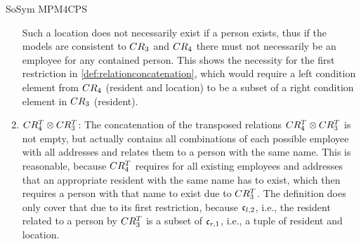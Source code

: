 \begin{copiedFrom}{SoSym MPM4CPS}
\begin{example}
\begin{enumerate}
Such a location does not necessarily exist if a person %
exists, thus if the models are consistent to $CR_{3}$ and $CR_{4}$ there must not necessarily be an employee for any contained person.
This shows the necessity for the first restriction in \autoref{def:relationconcatenation}, which would require a left condition element from $CR_{4}$ (resident and location) to be a subset of a right condition element in $CR_{3}$ (resident). %
    \item $CR^T_{4} \otimes CR^T_{3}$: 
The concatenation of the transposed relations $CR^T_{4} \otimes CR^T_{3}$ is not empty, but actually contains all combinations of each possible employee with all addresses and relates them to a person with the same name.
This is reasonable, because $CR^T_{4}$ requires for all existing employees and addresses that an appropriate resident with the same name %
has to exist, which then requires a person with that name to exist due to $CR^T_{3}$.
The definition does only cover that due to its first restriction, because $\mathfrak{c}_{l,2}$, i.e., the resident related to a person by $CR^T_{3}$ is a subset of $\mathfrak{c}_{r,1}$, i.e., a tuple of resident and location.
\end{enumerate}
\end{example}


\end{copiedFrom}

